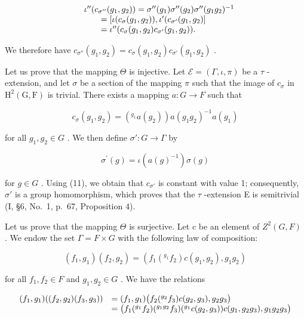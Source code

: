 \[
\begin{array}{r l} & {\iota^ {\prime \prime} (c _ {\sigma^ {\prime \prime}} (g _ {1}, g _ {2})) = \sigma^ {\prime \prime} (g _ {1}) \sigma^ {\prime \prime} (g _ {2}) \sigma^ {\prime \prime} (g _ {1} g _ {2}) ^ {- 1}} \\ & {\qquad = [ \iota (c _ {\sigma} (g _ {1}, g _ {2})), \iota^ {\prime} (c _ {\sigma^ {\prime}} (g _ {1}, g _ {2}) ]} \\ & {\qquad = \iota^ {\prime \prime} (c _ {\sigma} (g _ {1}, g _ {2}) c _ {\sigma^ {\prime}} (g _ {1}, g _ {2})).} \end{array}
\]

We therefore have \(c_{\sigma''}(g_1, g_2) = c_\sigma(g_1, g_2)c_{\sigma'}(g_1, g_2)\) .

Let us prove that the mapping \(\Theta\) is injective. Let \(\mathcal{E} = (\Gamma, \iota, \pi)\) be a \(\tau\) -extension, and let \(\sigma\) be a section of the mapping \(\pi\) such that the image of \(c_{\sigma}\) in \(\mathrm{H}^{2}(\mathrm{G}, \mathrm{F})\) is trivial. There exists a mapping \(a : G \to F\) such that

\[
c _ {\sigma} (g _ {1}, g _ {2}) = (^ {g _ {1}} a (g _ {2})) a (g _ {1} g _ {2}) ^ {- 1} a (g _ {1})
\]

for all \(g_{1}, g_{2} \in G\) . We then define \(\sigma' : G \to \Gamma\) by

\[
\sigma^ {\prime} (g) = \iota (a (g) ^ {- 1}) \sigma (g)
\]

for \(g \in G\) . Using (11), we obtain that \(c_{\sigma'}\) is constant with value 1; consequently, \(\sigma'\) is a group homomorphism, which proves that the \(\tau\) -extension E is semitrivial (I, §6, No.~1, p.~67, Proposition 4).

Let us prove that the mapping \(\Theta\) is surjective. Let c be an element of \(Z^{2}(G,F)\) . We endow the set \(\Gamma = F \times G\) with the following law of composition:

\[
(f _ {1}, g _ {1}) (f _ {2}, g _ {2}) = \left(f _ {1} (^ {g _ {1}} f _ {2}) c (g _ {1}, g _ {2}), g _ {1} g _ {2}\right)\tag{12}
\]

for all \(f_{1}, f_{2} \in F\) and \(g_{1}, g_{2} \in G\) . We have the relations

\[
\begin{array}{r l} (f _ {1}, g _ {1}) ((f _ {2}, g _ {2}) (f _ {3}, g _ {3})) & = (f _ {1}, g _ {1}) \big (f _ {2} (^ {g _ {2}} f _ {3}) c (g _ {2}, g _ {3}), g _ {2} g _ {3} \big) \\ & = \big (f _ {1} (^ {g _ {1}} f _ {2}) (^ {g _ {1} g _ {2}} f _ {3}) (^ {g _ {1}} c (g _ {2}, g _ {3})) c (g _ {1}, g _ {2} g _ {3}), g _ {1} g _ {2} g _ {3} \big) \end{array}
\]

